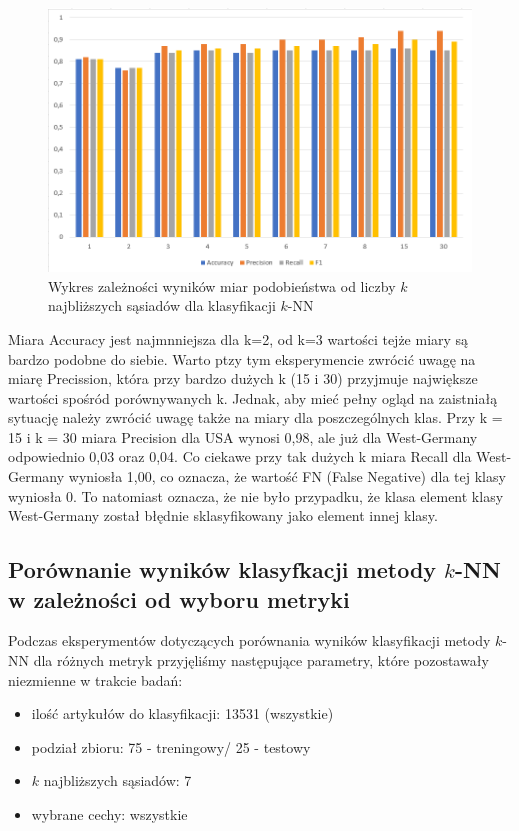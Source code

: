 \documentclass{classrep}
\begin{document}
\begin{figure}[H]
    \centering
    \includegraphics[width=14cm]{wykres_k.png}
    \caption{Wykres zależności wyników miar podobieństwa od liczby $k$ najbliższych sąsiadów dla klasyfikacji $k$-NN}
\end{figure}

Miara Accuracy jest najmnniejsza dla k=2, od k=3 wartości tejże miary są bardzo podobne do siebie. Warto ptzy tym eksperymencie zwrócić uwagę na miarę Precission, która przy bardzo dużych k (15 i 30) przyjmuje największe wartości spośród porównywanych k. Jednak, aby mieć pełny ogląd na zaistniałą sytuację należy zwrócić uwagę także na miary dla poszczególnych klas. Przy k = 15 i k = 30 miara Precision dla USA wynosi 0,98, ale już dla West-Germany odpowiednio 0,03 oraz 0,04. Co ciekawe przy tak dużych k miara Recall dla West-Germany wyniosła 1,00, co oznacza, że wartość FN (False Negative) dla tej klasy wyniosła 0. To natomiast oznacza, że nie było przypadku, że klasa element klasy West-Germany został błędnie sklasyfikowany jako element innej klasy.

\subsection{Porównanie wyników klasyfkacji metody $k$-NN w zależności od wyboru metryki}

Podczas eksperymentów dotyczących porównania wyników klasyfikacji metody $k$-NN dla różnych metryk przyjęliśmy następujące parametry, które pozostawały niezmienne w trakcie badań:
\begin{itemize}
    \item ilość artykułów do klasyfikacji: 13531 (wszystkie)
    \item podział zbioru: 75 - treningowy/ 25 - testowy
    \item $k$ najbliższych sąsiadów: 7
    \item wybrane cechy: wszystkie
\end{itemize}
\end{document}
